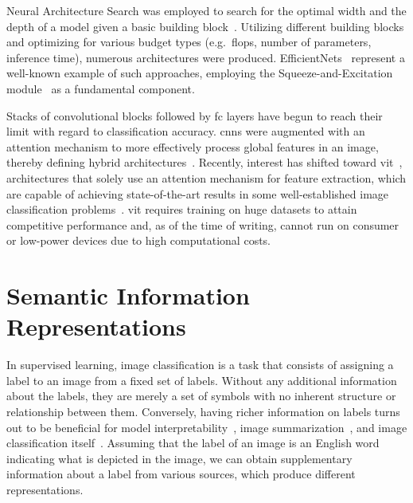 Neural Architecture Search was employed to search for the optimal width and the
depth of a model given a basic building block~\cite{ProgressiveNeuLiuC2017,
GeneticCnnXieL2017, LargeScaleEvoReal2017, RegularizedEvoReal2018}. Utilizing
different building blocks and optimizing for various budget types
(e.g.~\acrshort{flops}, number of parameters, inference time), numerous
architectures were produced. EfficientNets~\cite{EfficientnetRTanM2019,
Efficientnetv2TanM2021} represent a well-known example of such approaches,
employing the Squeeze-and-Excitation module~\cite{SqueezeAndExcHuJi2017} as a
fundamental component.

Stacks of convolutional blocks followed by \acrfull{fc} layers have begun to
reach their limit with regard to classification accuracy. \acrshort{cnn}s were
augmented with an attention mechanism to more effectively process global
features in an image, thereby defining hybrid
architectures~\cite{SpatialTransfoJaderb2015, LookAndThinkCaoC2015,
ShowAttendAnXuKe2015, ScaCnnSpatiaChen2016}. Recently, interest has shifted
toward \acrfull{vit}~\cite{AnImageIsWorDosovi2020}, architectures that solely
use an attention mechanism for feature extraction, which are capable of
achieving state-of-the-art results in some well-established image
classification problems~\cite{TransformersInKhan2021, ASurveyOnVisHanK2023}.
\acrshort{vit} requires training on huge datasets to attain competitive
performance and, as of the time of writing, cannot run on consumer or low-power %
devices due to high computational costs.

\section{Semantic Information Representations}
\label{sec:semantic-information-sources}

In supervised learning, image classification is a task that consists of
assigning a label to an image from a fixed set of labels. Without any
additional information about the labels, they are merely a set of symbols with
no inherent structure or relationship between them. Conversely, having richer %
information on labels turns out to be beneficial for model
interpretability~\cite{ImprovingInterDong2017}, image
summarization~\cite{SemanticImagePasini2022}, and image classification
itself~\cite{MakingBetterMBertin2019}. Assuming that the label of an image is
an English word indicating what is depicted in the image, we can obtain
supplementary information about a label from various sources, which produce
different representations.

